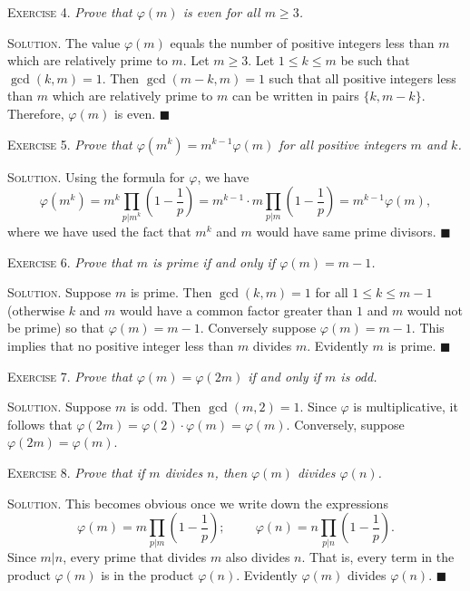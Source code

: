 \documentclass[11pt, leqno]{article}
\newcommand{\done}{\ensuremath{\blacksquare}}
\begin{document}
\textsc{Exercise 4}. \emph{Prove that $\varphi(m)$ is even for all $m\geq 3$.}

\textsc{Solution}. The value $\varphi(m)$ equals the number of positive integers less than $m$ which are relatively prime to $m$. Let $m\geq 3$. Let $1\leq k \leq m$ be such that $\gcd(k, m) = 1$. Then $\gcd(m-k, m) = 1$ such that all positive integers less than $m$ which are relatively prime to $m$ can be written in pairs $\{k, m-k\}$. Therefore, $\varphi(m)$ is even. \done

\textsc{Exercise 5}. \emph{Prove that $\varphi(m^k) = m^{k-1}\varphi(m)$ for all positive integers $m$ and $k$.}

\textsc{Solution}. Using the formula for $\varphi$, we have
\begin{displaymath}
\varphi(m^k) = m^k \prod_{p|m^k} \left(1-\frac{1}{p}\right) = m^{k-1}\cdot m \prod_{p|m}\left(1-\frac{1}{p}\right) = m^{k-1}\varphi(m),
\end{displaymath}
where we have used the fact that $m^k$ and $m$ would have same prime divisors. \done

\textsc{Exercise 6}. \emph{Prove that $m$ is prime if and only if $\varphi(m) = m-1$.}

\textsc{Solution}. Suppose $m$ is prime. Then $\gcd(k,m) = 1$ for all $1\leq k \leq m-1$ (otherwise $k$ and $m$ would have a common factor greater than $1$ and $m$ would not be prime) so that $\varphi(m) = m-1$. Conversely suppose $\varphi(m) = m-1$. This implies that no positive integer less than $m$ divides $m$. Evidently $m$ is prime. \done

\textsc{Exercise 7}. \emph{Prove that $\varphi(m) = \varphi(2m)$ if and only if $m$ is odd.}

\textsc{Solution}. Suppose $m$ is odd. Then $\gcd(m, 2)=1$. Since $\varphi$ is multiplicative, it follows that $\varphi(2m) = \varphi(2)\cdot \varphi(m) = \varphi(m)$. Conversely, suppose $\varphi(2m) = \varphi(m)$.

\textsc{Exercise 8}. \emph{Prove that if $m$ divides $n$, then $\varphi(m)$ divides $\varphi(n)$.}

\textsc{Solution}. This becomes obvious once we write down the expressions
\begin{displaymath}
\varphi(m) = m \prod_{p|m} \left(1-\frac{1}{p}\right); \hspace{1cm} \varphi(n) = n \prod_{p|n} \left(1-\frac{1}{p}\right).
\end{displaymath}
Since $m|n$, every prime that divides $m$ also divides $n$. That is, every term in the product $\varphi(m)$ is in the product $\varphi(n)$. Evidently $\varphi(m)$ divides $\varphi(n)$. \done
\end{document}

